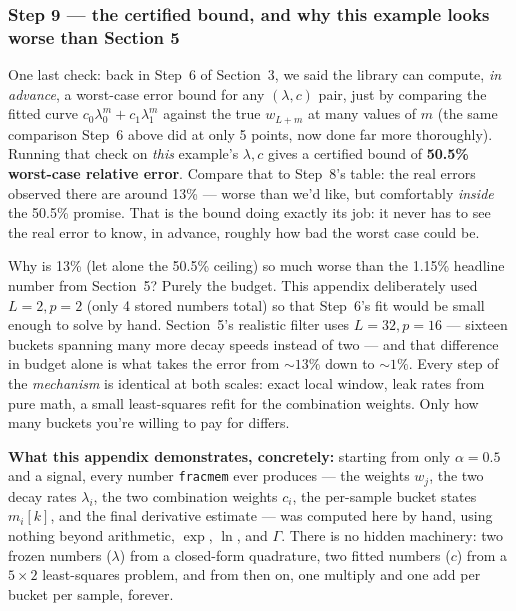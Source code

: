 \documentclass[11pt]{article}
\begin{document}
\subsubsection*{Step 9 --- the certified bound, and why this example looks worse than Section 5}
One last check: back in Step~6 of Section~3, we said the library can compute, \emph{in advance}, a worst-case error bound for any $(\lambda,c)$ pair, just by comparing the fitted curve $c_0\lambda_0^m+c_1\lambda_1^m$ against the true $w_{L+m}$ at many values of $m$ (the same comparison Step~6 above did at only 5 points, now done far more thoroughly). Running that check on \emph{this} example's $\lambda,c$ gives a certified bound of \textbf{50.5\% worst-case relative error}. Compare that to Step~8's table: the real errors observed there are around 13\% --- worse than we'd like, but comfortably \emph{inside} the 50.5\% promise. That is the bound doing exactly its job: it never has to see the real error to know, in advance, roughly how bad the worst case could be.

Why is 13\% (let alone the 50.5\% ceiling) so much worse than the 1.15\% headline number from Section~5? Purely the budget. This appendix deliberately used $L{=}2,p{=}2$ (only 4 stored numbers total) so that Step~6's fit would be small enough to solve by hand. Section~5's realistic filter uses $L{=}32,p{=}16$ --- sixteen buckets spanning many more decay speeds instead of two --- and that difference in budget alone is what takes the error from $\sim\!13\%$ down to $\sim\!1\%$. Every step of the \emph{mechanism} is identical at both scales: exact local window, leak rates from pure math, a small least-squares refit for the combination weights. Only how many buckets you're willing to pay for differs.

\begin{recap}
\textbf{What this appendix demonstrates, concretely:} starting from only $\alpha=0.5$ and a signal, every number \texttt{fracmem} ever produces --- the weights $w_j$, the two decay rates $\lambda_i$, the two combination weights $c_i$, the per-sample bucket states $m_i[k]$, and the final derivative estimate --- was computed here by hand, using nothing beyond arithmetic, $\exp$, $\ln$, and $\Gamma$. There is no hidden machinery: two frozen numbers ($\lambda$) from a closed-form quadrature, two fitted numbers ($c$) from a $5\times2$ least-squares problem, and from then on, one multiply and one add per bucket per sample, forever.
\end{recap}
\end{document}

